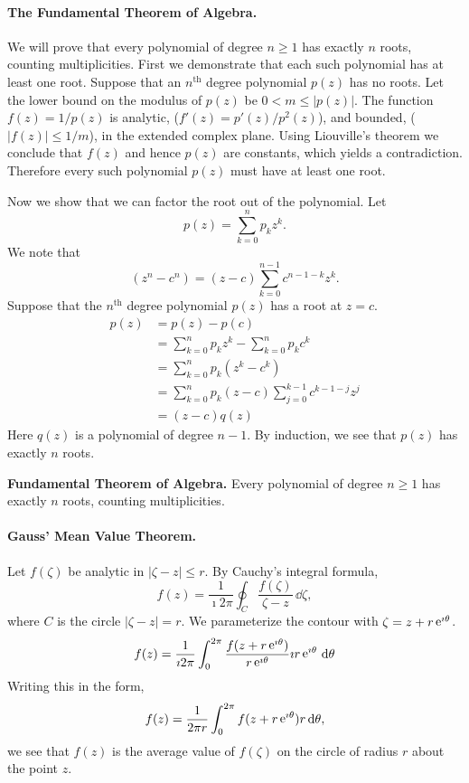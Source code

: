 \paragraph{The Fundamental Theorem of Algebra.}
We will prove that every polynomial of degree $n \geq 1$ has exactly $n$
roots, counting multiplicities.  First we demonstrate that each such
polynomial has at least one root.  Suppose that an $n^{\mathrm{th}}$ degree
polynomial $p(z)$ has no roots.  Let the lower bound on the modulus of 
$p(z)$ be $0 < m \leq |p(z)|$.  The function $f(z) = 1 / p(z)$ is
analytic, ($f'(z) = p'(z) / p^2(z)$), and bounded, ($|f(z)| \leq 1/m$), 
in the extended complex plane.   Using Liouville's theorem we conclude
that $f(z)$ and hence $p(z)$ are constants, which yields a contradiction.
Therefore every such polynomial $p(z)$ must have at least one root.

Now we show that we can factor the root out of the polynomial.
Let
\[
p(z) = \sum_{k = 0}^n p_k z^k.
\]
We note that
\[
\left( z^n - c^n \right) = (z - c) \sum_{k = 0}^{n-1} c^{n-1-k} z^k.
\]
Suppose that the $n^{\mathrm{th}}$ degree polynomial $p(z)$ has a root at $z = c$.
\begin{align*}
  p(z)    
  &= p(z) - p(c) 
  \\
  &= \sum_{k = 0}^n p_k z^k - \sum_{k = 0}^n p_k c^k 
  \\
  &= \sum_{k = 0}^n p_k \left( z^k - c^k \right)
  \\
  &= \sum_{k = 0}^n p_k (z - c) \sum_{j = 0}^{k-1} c^{k-1-j} z^j 
  \\
  &= (z - c) q(z)
\end{align*}
Here $q(z)$ is a polynomial of degree $n - 1$.  By induction, we see that
$p(z)$ has exactly $n$ roots.






\begin{Result}
  \label{fundamental_theorem_of_algebra}
  \textbf{Fundamental Theorem of Algebra.}
  Every polynomial of degree $n \geq 1$ has exactly $n$ roots, counting 
  multiplicities.
\end{Result}








\paragraph{Gauss' Mean Value Theorem.}
Let $f(\zeta)$ be analytic in $|\zeta - z| \leq r$.  By Cauchy's integral
formula,
\[
f(z) = \frac{1}{\imath 2 \pi} \oint_C \frac{ f(\zeta) }{ \zeta - z } \,\dd \zeta,
\]
where $C$ is the circle $|\zeta - z| = r$.  We parameterize the contour
with $\zeta = z + r \mathop{\mathrm{e}}\nolimits^{\imath \theta}$.
\[
f(z) = \frac{1}{\imath 2 \pi} 
\int_0^{2 \pi} \frac{ f(z + r \mathop{\mathrm{e}}\nolimits^{\imath \theta}) }{ r \mathop{\mathrm{e}}\nolimits^{\imath \theta} } \imath r \mathop{\mathrm{e}}\nolimits^{\imath \theta}\,\mathrm{d} \theta
\]
Writing this in the form,
\[
f(z) = \frac{1}{2 \pi r} \int_0^{2 \pi} f(z + r \mathop{\mathrm{e}}\nolimits^{\imath \theta}) r\,\mathrm{d} \theta,
\]
we see that $f(z)$ is the average value of $f(\zeta)$ on the circle of radius
$r$ about the point $z$.




